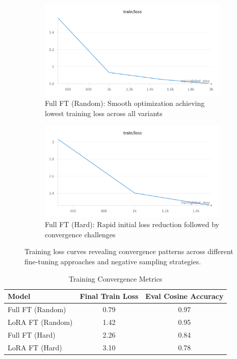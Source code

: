 \documentclass[conference]{IEEEtran}
\begin{document}
\begin{figure}[t]
\begin{subfigure}{0.48\textwidth}
\includegraphics[width=\textwidth]{sbert_finetuned_1million.png}
\caption{Full FT (Random): Smooth optimization achieving lowest training loss across all variants}
\end{subfigure}
\hfill
\begin{subfigure}{0.48\textwidth}
\includegraphics[width=\textwidth]{sbert_finetuned_hard_negatives.png}
\caption{Full FT (Hard): Rapid initial loss reduction followed by convergence challenges}
\end{subfigure}
\caption{Training loss curves revealing convergence patterns across different fine-tuning approaches and negative sampling strategies.}
\label{fig:training_curves}
\end{figure}

\begin{table}[h]
\centering
\caption{Training Convergence Metrics}
\label{tab:training_metrics}
\begin{tabular}{lcc}
\toprule
Model & Final Train Loss & Eval Cosine Accuracy \\
\midrule
Full FT (Random) & 0.79 & 0.97 \\
LoRA FT (Random) & 1.42 & 0.95 \\
Full FT (Hard) & 2.26 & 0.84 \\
LoRA FT (Hard) & 3.10 & 0.78 \\
\bottomrule
\end{tabular}
\end{table}
\end{document}
